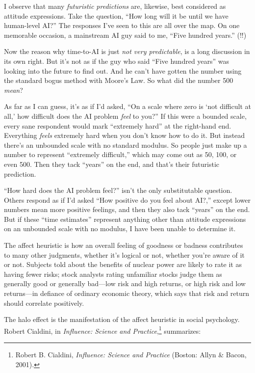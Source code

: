 {
 I observe that many \textit{futuristic predictions} are, likewise,
best considered as attitude expressions. Take the question,
``How long will it be until we have human-level
AI?'' The responses I've seen to this
are all over the map. On one memorable occasion, a mainstream AI guy
said to me, ``Five hundred years.''
(!!)}

{
 Now the reason why time-to-AI is just \textit{not very
predictable}, is a long discussion in its own right. But
it's not as if the guy who said ``Five
hundred years'' was looking into the future to find
out. And he can't have gotten the number using the
standard bogus method with Moore's Law. So what did the
number 500 \textit{mean}?}

{
 As far as I can guess, it's as if
I'd asked, ``On a scale where zero is
`not difficult at all,' how difficult
does the AI problem \textit{feel} to you?'' If this
were a bounded scale, every sane respondent would mark
``extremely hard'' at the right-hand
end. Everything \textit{feels} extremely hard when you
don't know how to do it. But instead
there's an unbounded scale with no standard modulus. So
people just make up a number to represent ``extremely
difficult,'' which may come out as 50, 100, or even
500. Then they tack ``years'' on the
end, and that's their futuristic prediction.}

{
 ``How hard does the AI problem
feel?'' isn't the only substitutable
question. Others respond as if I'd asked
``How positive do you feel about
AI?,'' except lower numbers mean more positive
feelings, and then they also tack
``years'' on the end. But if these
``time estimates'' represent
anything other than attitude expressions on an unbounded scale with no
modulus, I have been unable to determine it.}

\myendsectiontext


\bigskip


{
 The affect heuristic is how an overall feeling of goodness or
badness contributes to many other judgments, whether
it's logical or not, whether you're
aware of it or not. Subjects told about the benefits of nuclear power
are likely to rate it as having fewer risks; stock analysts rating
unfamiliar stocks judge them as generally good or generally bad---low
risk and high returns, or high risk and low returns---in defiance of
ordinary economic theory, which says that risk and return should
correlate positively. }

{
 The halo effect is the manifestation of the affect heuristic in
social psychology. Robert Cialdini, in \textit{Influence: Science and
Practice},\footnote{Robert B. Cialdini, \textit{Influence: Science and Practice}
(Boston: Allyn \& Bacon, 2001).} summarizes:}

